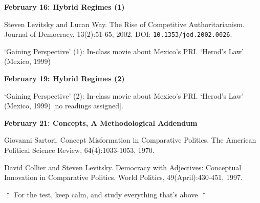 \documentclass[letterpaper]{article}
\renewenvironment{itemize}{
  \begin{list}{}{
    \setlength{\leftmargin}{1.5em}
  }
}{
  \end{list}
}
\begin{document}
\begin{enumerate}
\vspace{3mm}

\begin{itemize}

		\item {\bf February 16: Hybrid Regimes (1)}
			\begin{itemize}
				\item[$\bullet$] Steven Levitsky and Lucan Way. The Rise of Competitive Authoritarianism. Journal of Democracy, 13(2):51-65, 2002. DOI: \texttt{10.1353/jod.2002.0026}.
				\item[$\bullet$] `Gaining Perspective' (1): In-class movie about Mexico's PRI. `Herod's Law' (Mexico, 1999)
			\end{itemize}

		\item {\bf February 19: Hybrid Regimes (2)}
			\begin{itemize}
				\item[$\bullet$] `Gaining Perspective' (2): In-class movie about Mexico's PRI. `Herod's Law' (Mexico, 1999) [no readings assigned].
			\end{itemize}



		\item {\bf February 21: Concepts, A Methodological Addendum}
			\begin{itemize}
				\item[$\bullet$] Giovanni Sartori. Concept Misformation in Comparative Politics. The American Political Science Review, 64(4):1033-1053, 1970.
				\item[$\bullet$] David Collier and Steven Levitsky. Democracy with Adjectives: Conceptual Innovation in Comparative Politics. World Politics, 49(April):430-451, 1997.
			\end{itemize}
		
	
	\end{itemize}

\vspace{3mm}

	\begin{center}$\uparrow$ {\color{blue}For the test, keep calm, and study everything that's above} $\uparrow$\end{center}
	\begin{center}\Smiley{}\end{center}



\end{enumerate}
\end{document}
